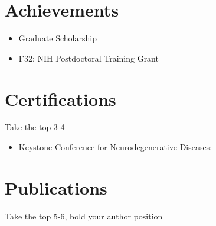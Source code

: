 \documentclass{article}
\begin{document}
\section{Achievements}
\begin{itemize}
\item Graduate Scholarship 
\item F32: NIH Postdoctoral Training Grant
\end{itemize}

\section{Certifications}

Take the top 3-4
\begin{itemize}
\item Keystone Conference for Neurodegenerative Diseases:
\end{itemize}

 
\section{Publications}
Take the top 5-6, bold your author position 
\end{document}
